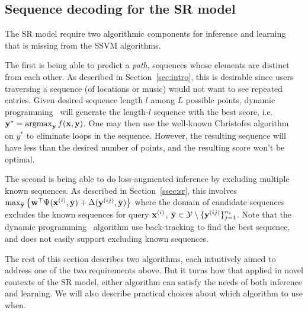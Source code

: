 
\subsection{Sequence decoding for the SR model}
\label{ssec:subtour}

The SR model require two algorithmic components for inference and learning that is missing from the SSVM algorithms. 

The first is being able to predict a {\em path}, \ie sequences whose elements are distinct from each other. 
As described in Section~\ref{sec:intro}, this is desirable since users traversing a sequence (of locations or music)
would not want to see repeated entries. 
Given desired sequence length $l$ among $L$ possible points, dynamic programming~\cite{tsochantaridis2005large} 
will generate the length-$l$ sequence with the best score, i.e. $\mathbf{y}^* = \operatorname*{argmax}_{\mathbf{y}} f(\mathbf{x},\mathbf{y})$. 
One may then use the well-known 
Christofes algorithm~\cite{christofides1976} on $y^*$ to eliminate loops in the sequence. 
However, the resulting sequence will have less than the desired number of points, and the resulting score won't be optimal. 

The second is being able to do loss-augmented inference by excluding multiple known sequences. 
As described in Section~\ref{ssec:sr}, this involves %
$\max_{\bar{\mathbf{y}}} \left\{ \mathbf{w}^\top \Psi(\mathbf{x}^{(i)}, \bar{\mathbf{y}}) + \Delta(\mathbf{y}^{(ij)}, \bar{\mathbf{y}}) \right\}$
where the domain of candidate sequences excludes the known sequences for query $\mathbf{x}^{(i)}$, \ie $\bar{\mathbf{y}} \in \mathcal{Y} \setminus \{\mathbf{y}^{(ij)}\}_{j=1}^{n_i}$. 
Note that the dynamic programming~\cite{tsochantaridis2005large} algorithm use back-tracking to find the best sequence, 
and does not easily support excluding known sequences. 


The rest of this section describes two algorithms, each intuitively aimed to address one of the two requirements above. 
But it turns how that applied in novel contexts of the SR model, 
either algorithm can satisfy the needs of both inference and learning. 
We will also describe practical choices about which algorithm to use when. 


